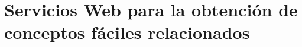 \chapter{Servicios Web para la obtención de conceptos fáciles relacionados}
\label{cap:serviciosWebImplementados}

